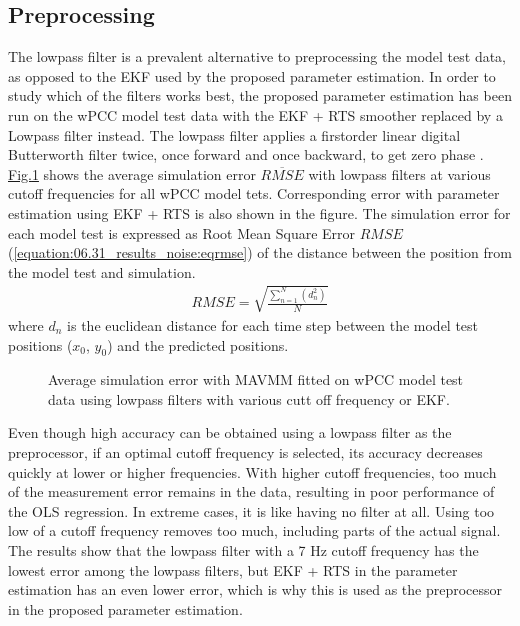 \documentclass[review]{elsarticle}
\begin{document}
\subsection{Preprocessing}
\label{\detokenize{06.31_results_noise:preprocessing}}\label{\detokenize{06.31_results_noise::doc}}
\sphinxAtStartPar
The low\sphinxhyphen{}pass filter is a prevalent alternative to preprocessing the model test data, as opposed to the EKF used by the proposed parameter estimation.
In order to study which of the filters works best, the proposed parameter estimation has been run on the wPCC model test data with the EKF + RTS smoother replaced by a Low\sphinxhyphen{}pass filter instead. The low\sphinxhyphen{}pass filter applies a first\sphinxhyphen{}order linear digital Butterworth filter twice, once forward and once backward, to get zero phase \cite{virtanen_scipy_2020}. \hyperref[\detokenize{06.31_results_noise:fig-lowpass-accuracy}]{Fig.\@ \ref{\detokenize{06.31_results_noise:fig-lowpass-accuracy}}} shows the average simulation error \( \overline{RMSE} \) with low\sphinxhyphen{}pass filters at various cut\sphinxhyphen{}off frequencies for all wPCC model tets. Corresponding error with parameter estimation using EKF + RTS is also shown in the figure. The simulation error for each model test is expressed as Root Mean Square Error \(RMSE\) (\autoref{equation:06.31_results_noise:eqrmse}) of the distance between the position from the model test and simulation.
\begin{equation}\label{equation:06.31_results_noise:eqrmse}
\begin{split}RMSE=\sqrt{ \frac{\sum_{n=1}^{N} (d_n^2) }{N}} \end{split}
\end{equation}
\sphinxAtStartPar
where \(d_n\) is the euclidean distance for each time step between the model test positions (\(x_0\), \(y_0\)) and the predicted positions.

\begin{figure}[H]
\centering
\capstart

\noindent{}
\caption{Average simulation error with MAVMM fitted on wPCC model test data using low\sphinxhyphen{}pass filters with various cutt off frequency or EKF.}\label{\detokenize{06.31_results_noise:fig-lowpass-accuracy}}\end{figure}

\sphinxAtStartPar
Even though high accuracy can be obtained using a low\sphinxhyphen{}pass filter as the pre\sphinxhyphen{}processor, if an optimal cut\sphinxhyphen{}off frequency is selected, its accuracy decreases quickly at lower or higher frequencies. With higher cut\sphinxhyphen{}off frequencies, too much of the measurement error remains in the data, resulting in poor performance of the OLS regression. In extreme cases, it is like having no filter at all. Using too low of a cut\sphinxhyphen{}off frequency removes too much, including parts of the actual signal. The results show that the low\sphinxhyphen{}pass filter with a 7 Hz cut\sphinxhyphen{}off frequency has the lowest error among the low\sphinxhyphen{}pass filters, but EKF + RTS in the parameter estimation has an even lower error, which is why this is used as the preprocessor in the proposed parameter estimation.
\end{document}
